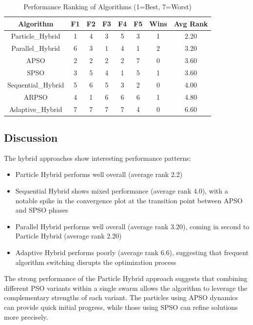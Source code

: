 \documentclass[conference]{IEEEtran}
\begin{document}
\begin{table}[htbp]
\caption{Performance Ranking of Algorithms (1=Best, 7=Worst)}
\begin{center}
\begin{tabular}{|c|c|c|c|c|c|c|c|}
\hline
\textbf{Algorithm} & \textbf{F1} & \textbf{F2} & \textbf{F3} & \textbf{F4} & \textbf{F5} & \textbf{Wins} & \textbf{Avg Rank} \\
\hline
Particle\_Hybrid & 1 & 4 & 3 & 5 & 3 & 1 & 2.20 \\
\hline
Parallel\_Hybrid & 6 & 3 & 1 & 4 & 1 & 2 & 3.20 \\
\hline
APSO & 2 & 2 & 2 & 2 & 7 & 0 & 3.60 \\
\hline
SPSO & 3 & 5 & 4 & 1 & 5 & 1 & 3.60 \\
\hline
Sequential\_Hybrid & 5 & 6 & 5 & 3 & 2 & 0 & 4.00 \\
\hline
ARPSO & 4 & 1 & 6 & 6 & 6 & 1 & 4.80 \\
\hline
Adaptive\_Hybrid & 7 & 7 & 7 & 7 & 4 & 0 & 6.60 \\
\hline
\end{tabular}
\label{tab:hybrid_results}
\end{center}
\end{table}

\subsection{Discussion}
The hybrid approaches show interesting performance patterns:

\begin{itemize}
    \item Particle Hybrid performs well overall (average rank 2.2)
    \item Sequential Hybrid shows mixed performance (average rank 4.0), with a notable spike in the convergence plot at the transition point between APSO and SPSO phases
    \item Parallel Hybrid performs well overall (average rank 3.20), coming in second to Particle Hybrid (average rank 2.20)
    \item Adaptive Hybrid performs poorly (average rank 6.6), suggesting that frequent algorithm switching disrupts the optimization process
\end{itemize}

The strong performance of the Particle Hybrid approach suggests that combining different PSO variants within a single swarm allows the algorithm to leverage the complementary strengths of each variant. The particles using APSO dynamics can provide quick initial progress, while those using SPSO can refine solutions more precisely.
\end{document}
